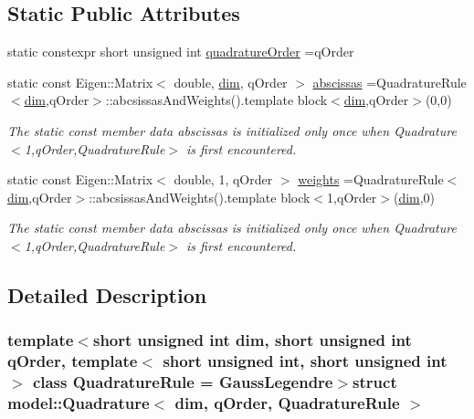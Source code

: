 \subsection*{Static Public Attributes}
\begin{DoxyCompactItemize}
\item 
static constexpr short unsigned int \hyperlink{structmodel_1_1_quadrature_a9cd62ae38e0cc707065ff7b1f57785da}{quadrature\+Order} =q\+Order
\item 
static const Eigen\+::\+Matrix$<$ double, \hyperlink{plot_nd_a_8m_a382f3ca768b275b8d563604f7fc7df73}{dim}, q\+Order $>$ \hyperlink{structmodel_1_1_quadrature_a39bde8b8646999b05a493eedc7202299}{abscissas} =Quadrature\+Rule$<$\hyperlink{plot_nd_a_8m_a382f3ca768b275b8d563604f7fc7df73}{dim},q\+Order$>$\+::abcsissas\+And\+Weights().template block$<$\hyperlink{plot_nd_a_8m_a382f3ca768b275b8d563604f7fc7df73}{dim},q\+Order$>$(0,0)
\begin{DoxyCompactList}\small\item\em The static const member data abscissas is initialized only once when Quadrature$<$1,q\+Order,\+Quadrature\+Rule$>$ is first encountered. \end{DoxyCompactList}\item 
static const Eigen\+::\+Matrix$<$ double, 1, q\+Order $>$ \hyperlink{structmodel_1_1_quadrature_aad89450c9a6dd8f1f39eb219d13b2cd6}{weights} =Quadrature\+Rule$<$\hyperlink{plot_nd_a_8m_a382f3ca768b275b8d563604f7fc7df73}{dim},q\+Order$>$\+::abcsissas\+And\+Weights().template block$<$1,q\+Order$>$(\hyperlink{plot_nd_a_8m_a382f3ca768b275b8d563604f7fc7df73}{dim},0)
\begin{DoxyCompactList}\small\item\em The static const member data abscissas is initialized only once when Quadrature$<$1,q\+Order,\+Quadrature\+Rule$>$ is first encountered. \end{DoxyCompactList}\end{DoxyCompactItemize}


\subsection{Detailed Description}
\subsubsection*{template$<$short unsigned int dim, short unsigned int q\+Order, template$<$ short unsigned int, short unsigned int $>$ class Quadrature\+Rule = Gauss\+Legendre$>$struct model\+::\+Quadrature$<$ dim, q\+Order, Quadrature\+Rule $>$}

